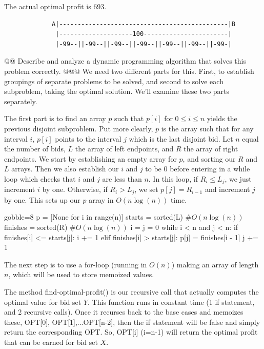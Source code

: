 \documentclass[10pt]{article}\usepackage[]{graphicx}\usepackage[]{xcolor}
\begin{document}
\begin{easylist}[enumerate]
    The actual optimal profit is 693.

    \begin{verbatim}
             A|----------------------------------------------|B
              |--------------------100-----------------------|
              |-99--||-99--||-99--||-99--||-99--||-99--||-99-|
    \end{verbatim}

    @@ Describe and analyze a dynamic programming algorithm that solves this problem correctly.
    @@@ We need two different parts for this. First, to establish groupings of separate problems to be solved, and
    second to solve each subproblem, taking the optimal solution. We'll examine these two parts separately.\newline

    The first part is to find an array $p$ such that $p[i]$ for $0 \le i \le n$ yields the previous disjoint subproblem.
    Put more clearly, $p$ is the array such that for any interval $i$, $p[i]$ points to the interval $j$ which is the
    last disjoint bid. Let $n$ equal the number of bids, $L$ the array of left endpoints, and $R$ the array of right
    endpoints. We start by establishing an empty array for $p$, and sorting our $R$ and $L$ arrays. Then we also
    establish our $i$ and $j$ to be 0 before entering in a while loop which checks that $i$ and $j$ are less than $n$.
    In this loop, if $R_i \le L_j$, we just increment $i$ by one. Otherwise, if $R_i > L_j$, we set $p[j] = R_{i-1}$ and
    increment $j$ by one. This sets up our $p$ array in $O(n \log(n))$ time.

    \begin{pythoncode*}{gobble=8}
        p        = [None for i in range(n)]
        starts   = sorted(L)   #$O\left(n\log(n)\right)$
        finishes = sorted(R)   #$O\left(n\log(n)\right)$
        i = j = 0
        while i < n and j < n:
            if finishes[i] <= starts[j]:
                i += 1
            elif finishes[i] > starts[j]:
                p[j] = finishes[i - 1]
                j += 1
    \end{pythoncode*}

    The next step is to use a {\ttfamily for-loop} (running in $O(n)$) making an array of length $n$, which will be used
    to store memoized values.\newline

    The method {\ttfamily find-optimal-profit()} is our recursive call that actually computes the optimal value for bid
    set $Y$.  This function runs in constant time (1 if statement, and 2 recursive calls).  Once it recurses back to the
    base cases and memoizes these, {\ttfamily OPT[0], OPT[1],...OPT[n-2]}, then the {\ttfamily if} statement will be
    false and simply return the corresponding {\ttfamily OPT}.  So, {\ttfamily OPT[i] (i=n-1)} will return the optimal
    profit that can be earned for bid set $X$.\newline


\end{easylist}
\end{document}
